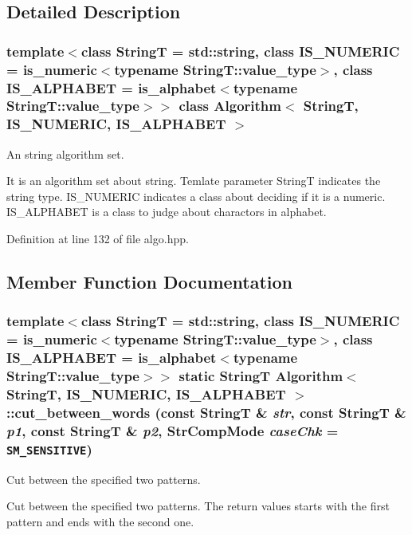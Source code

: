 \subsection{Detailed Description}
\subsubsection*{template$<$class StringT = std::string, class IS\_\-NUMERIC = is\_\-numeric$<$typename StringT::value\_\-type$>$, class IS\_\-ALPHABET = is\_\-alphabet$<$typename StringT::value\_\-type$>$$>$ class Algorithm$<$ StringT, IS\_\-NUMERIC, IS\_\-ALPHABET $>$}

An string algorithm set. 

It is an algorithm set about string. Temlate parameter StringT indicates the string type. IS\_\-NUMERIC indicates a class about deciding if it is a numeric. IS\_\-ALPHABET is a class to judge about charactors in alphabet. 

Definition at line 132 of file algo.hpp.

\subsection{Member Function Documentation}
\hypertarget{classAlgorithm_5e4035b8afe3b04f371314b4e6840798}{
\subsubsection[{cut\_\-between\_\-words}]{\setlength{\rightskip}{0pt plus 5cm}template$<$class StringT  = std::string, class IS\_\-NUMERIC  = is\_\-numeric$<$typename StringT::value\_\-type$>$, class IS\_\-ALPHABET  = is\_\-alphabet$<$typename StringT::value\_\-type$>$$>$ static StringT {\bf Algorithm}$<$ StringT, IS\_\-NUMERIC, IS\_\-ALPHABET $>$::cut\_\-between\_\-words (const StringT \& {\em str}, \/  const StringT \& {\em p1}, \/  const StringT \& {\em p2}, \/  StrCompMode {\em caseChk} = {\tt SM\_\-SENSITIVE})}}
\label{classAlgorithm_5e4035b8afe3b04f371314b4e6840798}


Cut between the specified two patterns. 

Cut between the specified two patterns. The return values starts with the first pattern and ends with the second one. 

